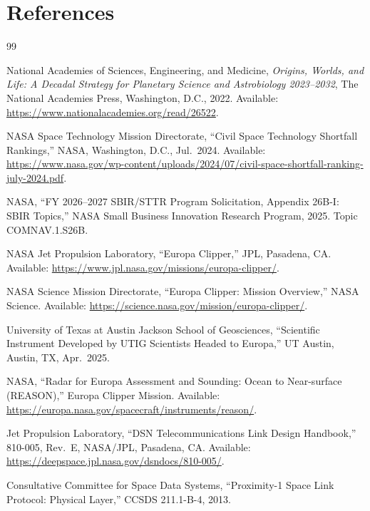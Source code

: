 \documentclass[11pt]{article}
\begin{document}
\newpage
\section{References}

\begin{thebibliography}{99}

National Academies of Sciences, Engineering, and Medicine,
\textit{Origins, Worlds, and Life: A Decadal Strategy for Planetary Science and Astrobiology
2023--2032}, The National Academies Press, Washington, D.C., 2022.
Available: \url{https://www.nationalacademies.org/read/26522}.

NASA Space Technology Mission Directorate,
``Civil Space Technology Shortfall Rankings,'' NASA, Washington, D.C., Jul.\ 2024.
Available: \url{https://www.nasa.gov/wp-content/uploads/2024/07/civil-space-shortfall-ranking-july-2024.pdf}.

NASA, ``FY 2026--2027 SBIR/STTR Program Solicitation, Appendix 26B-I: SBIR Topics,'' NASA Small
Business Innovation Research Program, 2025. Topic COMNAV.1.S26B.

NASA Jet Propulsion Laboratory, ``Europa Clipper,'' JPL, Pasadena, CA.
Available: \url{https://www.jpl.nasa.gov/missions/europa-clipper/}.

NASA Science Mission Directorate, ``Europa Clipper: Mission Overview,'' NASA Science.
Available: \url{https://science.nasa.gov/mission/europa-clipper/}.

University of Texas at Austin Jackson School of Geosciences, ``Scientific Instrument Developed
by UTIG Scientists Headed to Europa,'' UT Austin, Austin, TX, Apr.\ 2025.

NASA, ``Radar for Europa Assessment and Sounding: Ocean to Near-surface (REASON),'' Europa
Clipper Mission. Available: \url{https://europa.nasa.gov/spacecraft/instruments/reason/}.

Jet Propulsion Laboratory, ``DSN Telecommunications Link Design Handbook,'' 810-005, Rev.~E,
NASA/JPL, Pasadena, CA. Available: \url{https://deepspace.jpl.nasa.gov/dsndocs/810-005/}.

Consultative Committee for Space Data Systems, ``Proximity-1 Space Link Protocol: Physical
Layer,'' CCSDS 211.1-B-4, 2013.


\end{thebibliography}
\end{document}
